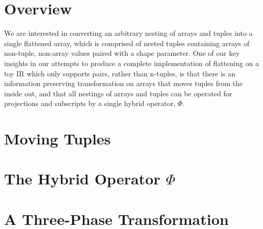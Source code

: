 \documentclass[11pt]{amsart}
\begin{document}
\section{Overview}

We are interested in converting an arbitrary nesting of arrays and tuples into a single flattened array, which is comprised of nested tuples containing arrays of non-tuple, non-array values paired with a shape parameter.
One of our key insights in our attempts to produce a complete implementation of flattening on a toy IR which only supports pairs, rather than n-tuples, is that there is an information preserving transformation on arrays that moves tuples from the inside out, and that all nestings of arrays and tuples can be operated for projections and subscripts by a single hybrid operator, $\Phi$.

\section{Moving Tuples}

\section{The Hybrid Operator $\Phi$}

\section{A Three-Phase Transformation}
\end{document}
